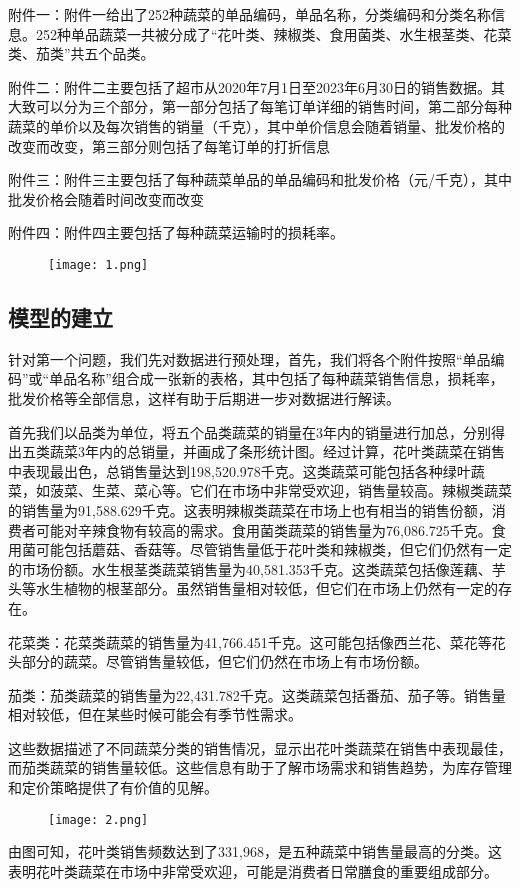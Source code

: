 \documentclass[withoutpreface,bwprint]{cumcmthesis} %
\begin{document}
		附件一：附件一给出了252种蔬菜的单品编码，单品名称，分类编码和分类名称信息。252种单品蔬菜一共被分成了“花叶类、辣椒类、食用菌类、水生根茎类、花菜类、茄类”共五个品类。
		
		附件二：附件二主要包括了超市从2020年7月1日至2023年6月30日的销售数据。其大致可以分为三个部分，第一部分包括了每笔订单详细的销售时间，第二部分每种蔬菜的单价以及每次销售的销量（千克），其中单价信息会随着销量、批发价格的改变而改变，第三部分则包括了每笔订单的打折信息
		
		附件三：附件三主要包括了每种蔬菜单品的单品编码和批发价格（元/千克），其中批发价格会随着时间改变而改变
		
		附件四：附件四主要包括了每种蔬菜运输时的损耗率。
			\begin{figure}[H]
			\centering
			\texttt{[image: 1.png]}
		\end{figure}
			\subsection{模型的建立}
		针对第一个问题，我们先对数据进行预处理，首先，我们将各个附件按照“单品编码”或“单品名称”组合成一张新的表格，其中包括了每种蔬菜销售信息，损耗率，批发价格等全部信息，这样有助于后期进一步对数据进行解读。
		
		首先我们以品类为单位，将五个品类蔬菜的销量在3年内的销量进行加总，分别得出五类蔬菜3年内的总销量，并画成了条形统计图。经过计算，花叶类蔬菜在销售中表现最出色，总销售量达到198,520.978千克。这类蔬菜可能包括各种绿叶蔬菜，如菠菜、生菜、菜心等。它们在市场中非常受欢迎，销售量较高。辣椒类蔬菜的销售量为91,588.629千克。这表明辣椒类蔬菜在市场上也有相当的销售份额，消费者可能对辛辣食物有较高的需求。食用菌类蔬菜的销售量为76,086.725千克。食用菌可能包括蘑菇、香菇等。尽管销售量低于花叶类和辣椒类，但它们仍然有一定的市场份额。水生根茎类蔬菜销售量为40,581.353千克。这类蔬菜包括像莲藕、芋头等水生植物的根茎部分。虽然销售量相对较低，但它们在市场上仍然有一定的存在。
		
		花菜类：花菜类蔬菜的销售量为41,766.451千克。这可能包括像西兰花、菜花等花头部分的蔬菜。尽管销售量较低，但它们仍然在市场上有市场份额。
		
		茄类：茄类蔬菜的销售量为22,431.782千克。这类蔬菜包括番茄、茄子等。销售量相对较低，但在某些时候可能会有季节性需求。
		
		这些数据描述了不同蔬菜分类的销售情况，显示出花叶类蔬菜在销售中表现最佳，而茄类蔬菜的销售量较低。这些信息有助于了解市场需求和销售趋势，为库存管理和定价策略提供了有价值的见解。
			\begin{figure}[H]
			\centering
			\texttt{[image: 2.png]}
		\end{figure}
		由图可知，花叶类销售频数达到了331,968，是五种蔬菜中销售量最高的分类。这表明花叶类蔬菜在市场中非常受欢迎，可能是消费者日常膳食的重要组成部分。
		
\end{document}
